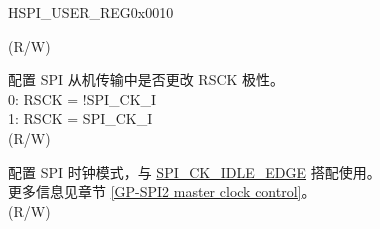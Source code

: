 \begin{register}{H}{SPI\_USER\_REG}{0x0010}
\begin{regdesc}
\begin{reglist}
(R/W)
\label{fielddesc:SPI3RSCKIEDGE}\item [SPI\_RSCK\_I\_EDGE] 配置 SPI 从机传输中是否更改 RSCK 极性。\\
0: RSCK = !SPI\_CK\_I \\
1: RSCK = SPI\_CK\_I \\ 
(R/W)
\label{fielddesc:SPI3CKOUTEDGE}\item [SPI\_CK\_OUT\_EDGE] 配置 SPI 时钟模式，与 \hyperref[fielddesc:SPICKIDLEEDGE]{SPI\_CK\_IDLE\_EDGE} 搭配使用。\\
更多信息见章节 \ref{GP-SPI2 master clock control}。\\
(R/W)
\item [见下页]
\end{reglist}\end{regdesc}
\end{register}

